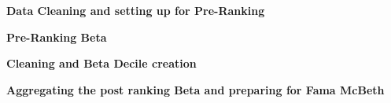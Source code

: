 \textbf{Data Cleaning and setting up for Pre-Ranking}

\textbf{Pre-Ranking Beta}

\textbf{Cleaning and Beta Decile creation}

\textbf{Aggregating the post ranking Beta and preparing for Fama McBeth}
